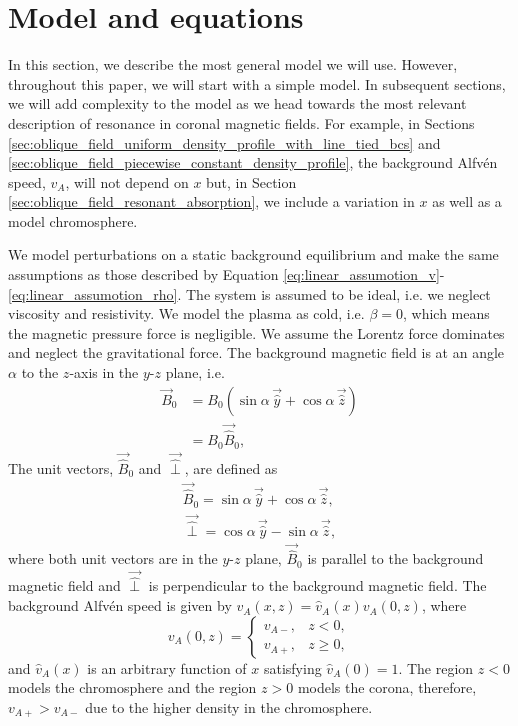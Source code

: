 \section{Model and equations}
\label{sec:chap_4_model_and_eqns}

In this section, we describe the most general model we will use. However, throughout this paper, we will start with a simple model. In subsequent sections, we will add complexity to the model as we head
towards the most relevant description of resonance in coronal magnetic fields. For example, in Sections \ref{sec:oblique_field_uniform_density_profile_with_line_tied_bcs} and \ref{sec:oblique_field_piecewise_constant_density_profile}, the background Alfv\'en speed, $v_A$, will not depend on $x$ but, in Section \ref{sec:oblique_field_resonant_absorption}, we include a variation in $x$ as well as a model chromosphere. 

We model perturbations on a static background equilibrium and make the same assumptions as those described by Equation \eqref{eq:linear_assumotion_v}-\eqref{eq:linear_assumotion_rho}. The system is assumed to be ideal, i.e. we neglect viscosity and resistivity. We model the plasma as cold, i.e. $\beta=0$, which means the magnetic pressure force is negligible. We assume the Lorentz force dominates and neglect the gravitational force. The background magnetic field is at an angle $\alpha$ to the $z$-axis in the $y$-$z$ plane, i.e.
\begin{equation}
    \label{eq:chap_4_background_field}
    \begin{aligned}
    \vec{B}_0 &= B_0(\sin\alpha\,\vec{\hat{y}}+\cos\alpha\,\vec{\hat{z}}) \\
    &= B_0\vec{\hat{B}}_0,
    \end{aligned}
\end{equation}
The unit vectors, $\vec{\hat{B}}_0$ and $\vec{\hat{\perp}}$, are defined as
\begin{gather}
    \vec{\hat{B}}_0 = \sin\alpha\,\vec{\hat{y}}+\cos\alpha\,\vec{\hat{z}}, \\
    \vec{\hat{\perp}} = \cos\alpha\,\vec{\hat{y}}-\sin\alpha\,\vec{\hat{z}},
\end{gather}
where both unit vectors are in the $y$-$z$ plane, $\vec{\hat{B}}_0$ is parallel to the background magnetic field and $\vec{\hat{\perp}}$ is perpendicular to the background magnetic field. 
The background Alfv\'en speed is given by $v_A(x,z) = \hat{v}_A(x)v_{A}(0,z)$, where
\begin{equation}
    \label{eq:chap_4_vA(0,z)}
    v_A(0,z)= \begin{cases}
    v_{A-}, & z < 0, \\
    v_{A+}, & z \ge 0,
    \end{cases}
\end{equation}
and $\hat{v}_A(x)$ is an arbitrary function of $x$ satisfying $\hat{v}_A(0)=1$. The region $z<0$ models the chromosphere and the region $z>0$ models the corona, therefore, $v_{A+}>v_{A-}$ due to the higher density in the chromosphere.

